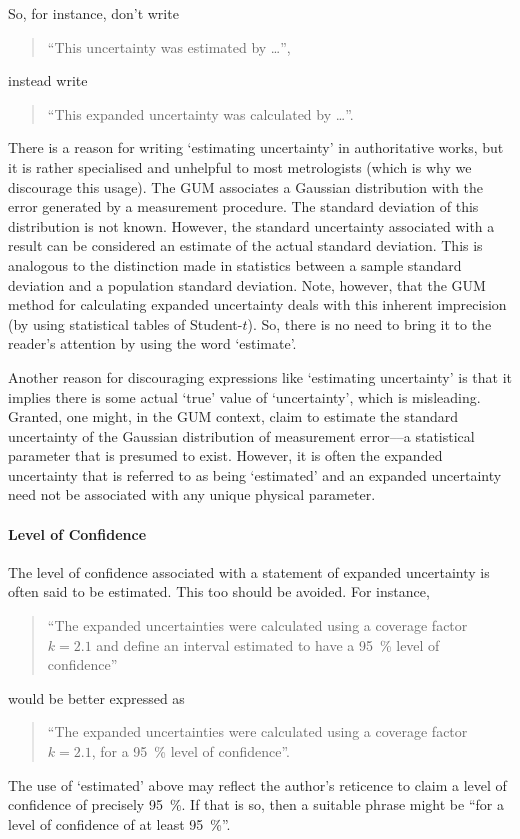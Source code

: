 So, for instance, don't write
\begin{quote}
``This uncertainty was estimated by …'',
\end{quote}
instead write
\begin{quote}
``This expanded uncertainty was calculated by …''.
\end{quote}
There is a reason for writing  `estimating uncertainty' in authoritative works, but it is rather specialised and unhelpful to most metrologists (which is why we discourage this usage). The GUM associates a Gaussian distribution with the error generated by a measurement procedure. The standard deviation of this  distribution is not known. However, the standard uncertainty associated with a result can be considered an estimate of the actual standard deviation. This is analogous to the distinction made in statistics between a sample standard deviation and a population standard deviation. Note, however, that the GUM method for calculating expanded uncertainty deals with this inherent imprecision (by using statistical tables of Student-$t$). So, there is no need to bring it to the reader's attention by using the word `estimate'.

Another reason for discouraging expressions like `estimating uncertainty' is that it implies there is some actual `true' value of `uncertainty', which is misleading. Granted, one might, in the GUM context, claim to estimate the standard uncertainty of the Gaussian distribution of measurement error–--a statistical parameter that is presumed to exist. However, it is often the expanded uncertainty that is referred to as being `estimated' and an expanded uncertainty need not be associated with any unique physical parameter.

\paragraph{Level of Confidence}
The level of confidence associated with a statement of expanded uncertainty is often said to be estimated. This too should be avoided. For instance,
\begin{quote}
``The expanded uncertainties were calculated using a coverage factor $k = 2.1$ and define an interval estimated to have a \SI{95}{\%} level of confidence''
\end{quote}
would be better expressed as
\begin{quote}
``The expanded uncertainties were calculated using a coverage factor $k = 2.1$, for a \SI{95}{\%} level of confidence''.
\end{quote}
The use of `estimated' above may reflect the author's reticence to claim a level of confidence of precisely \SI{95}{\%}. If that is so, then a suitable phrase might be ``for a level of confidence of at least \SI{95}{\%}''. 

